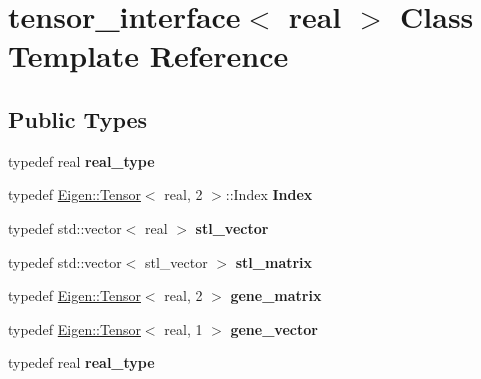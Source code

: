 \hypertarget{classtensor__interface}{}\section{tensor\+\_\+interface$<$ real $>$ Class Template Reference}
\label{classtensor__interface}
\subsection*{Public Types}
\begin{DoxyCompactItemize}
\item 
\mbox{\label{classtensor__interface_afa06faf8933a667881bc24804ad661f7}} 
typedef real {\bfseries real\+\_\+type}
\item 
\mbox{\label{classtensor__interface_a400cc4a34171aefeeb65249256d5fb44}} 
typedef \hyperlink{class_eigen_1_1_tensor}{Eigen\+::\+Tensor}$<$ real, 2 $>$\+::Index {\bfseries Index}
\item 
\mbox{\label{classtensor__interface_a16dac22850837e02cddb80efdd2e1882}} 
typedef std\+::vector$<$ real $>$ {\bfseries stl\+\_\+vector}
\item 
\mbox{\label{classtensor__interface_a3529526e75d1be756047a90bace424ed}} 
typedef std\+::vector$<$ stl\+\_\+vector $>$ {\bfseries stl\+\_\+matrix}
\item 
\mbox{\label{classtensor__interface_ae745087cb2eb6ffd72b7cdbae2b63e0f}} 
typedef \hyperlink{class_eigen_1_1_tensor}{Eigen\+::\+Tensor}$<$ real, 2 $>$ {\bfseries gene\+\_\+matrix}
\item 
\mbox{\label{classtensor__interface_ac0fd2d09e933ae3b7edefe9b52e8472d}} 
typedef \hyperlink{class_eigen_1_1_tensor}{Eigen\+::\+Tensor}$<$ real, 1 $>$ {\bfseries gene\+\_\+vector}
\item 
\mbox{\label{classtensor__interface_afa06faf8933a667881bc24804ad661f7}} 
typedef real {\bfseries real\+\_\+type}
\item 
\mbox{\label{classtensor__interface_a400cc4a34171aefeeb65249256d5fb44}} 

\end{DoxyCompactItemize}
